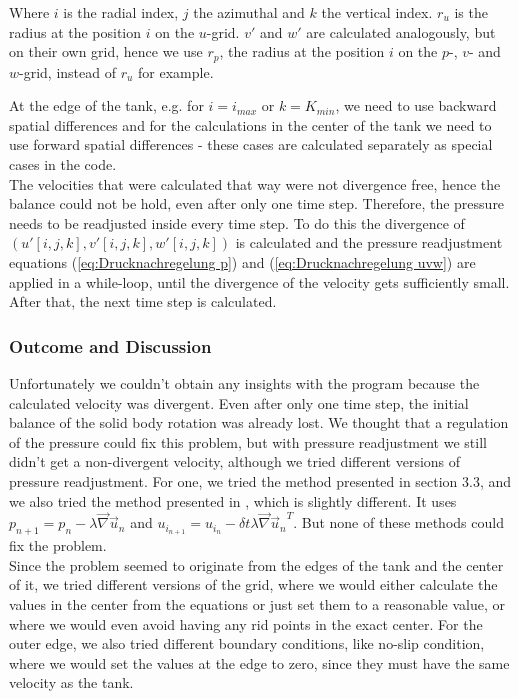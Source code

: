 \documentclass[12pt, a4paper]{article} %
\begin{document}
			Where $i$ is the radial index, $j$ the azimuthal and $k$ the vertical index. $r_u$ is the radius at the position $i$ on the $u$-grid. $v'$ and $w'$ are calculated analogously, but on their own grid, hence we use $r_p$, the radius at the position $i$ on the $p$-, $v$- and $w$-grid, instead of $r_u$ for example.
			
			At the edge of the tank, e.g. for $i=i_{max}$ or $k=K_{min}$, we need to use backward spatial differences and for the calculations in the center of the tank we need to use forward spatial differences - these cases are calculated separately as special cases in the code.\\
			
			The velocities that were calculated that way were not divergence free, hence the balance could not be hold, even after only one time step. Therefore, the pressure needs to be readjusted inside every time step. To do this the divergence of $\left(u'[i,j,k], v'[i,j,k], w'[i,j,k]\right)$ is calculated and the pressure readjustment equations (\ref{eq:Drucknachregelung p}) and (\ref{eq:Drucknachregelung uvw}) are applied in a while-loop, until the divergence of the velocity gets sufficiently small.
			After that, the next time step is calculated.
			
		\subsubsection{Outcome and Discussion}
			Unfortunately we couldn't obtain any insights with the program because the calculated velocity was divergent. Even after only one time step, the initial balance of the solid body rotation was already lost. We thought that a regulation of the pressure  could fix this problem, but with pressure readjustment we still  didn't get a non-divergent velocity, although we tried different versions of pressure readjustment. 
			For one, we tried the method presented in section 3.3, and we also tried the method presented in %
			, which is slightly different. It uses $p_{n+1} = p_n - \lambda \vec{\nabla} \vec{u}_n$ and $u_{i_{n+1}} = u_{i_{n}} - \delta t \lambda \vec{\nabla}{\vec{u}_n}^T$. But none of these methods could fix the problem.\\
			
			Since the problem seemed to originate from the edges of the tank and the center of it, we tried different versions of the grid, where we would either calculate the values in the center from the equations or just set them to a reasonable value, or where we would even avoid having any rid points in the exact center. For the outer edge, we also tried different boundary conditions, like no-slip condition, where we would set the values at the edge to zero, since they must have the same velocity as the tank.
			
\end{document}
